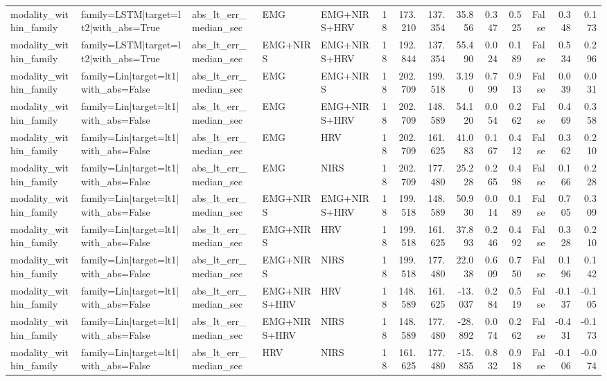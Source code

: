 \begin{table}
\begin{tabular}{lllllrrrrrrrrr}
modality_within_family & family=LSTM|target=lt2|with_abs=True & abs_lt_err_median_sec & EMG & EMG+NIRS+HRV & 18 & 173.210 & 137.354 & 35.856 & 0.347 & 0.525 & False & 0.348 & 0.173 \\
modality_within_family & family=LSTM|target=lt2|with_abs=True & abs_lt_err_median_sec & EMG+NIRS & EMG+NIRS+HRV & 18 & 192.844 & 137.354 & 55.490 & 0.024 & 0.189 & False & 0.534 & 0.296 \\
modality_within_family & family=Lin|target=lt1|with_abs=False & abs_lt_err_median_sec & EMG & EMG+NIRS & 18 & 202.709 & 199.518 & 3.190 & 0.799 & 0.913 & False & 0.039 & 0.031 \\
modality_within_family & family=Lin|target=lt1|with_abs=False & abs_lt_err_median_sec & EMG & EMG+NIRS+HRV & 18 & 202.709 & 148.589 & 54.120 & 0.054 & 0.262 & False & 0.469 & 0.358 \\
modality_within_family & family=Lin|target=lt1|with_abs=False & abs_lt_err_median_sec & EMG & HRV & 18 & 202.709 & 161.625 & 41.083 & 0.167 & 0.412 & False & 0.362 & 0.210 \\
modality_within_family & family=Lin|target=lt1|with_abs=False & abs_lt_err_median_sec & EMG & NIRS & 18 & 202.709 & 177.480 & 25.228 & 0.265 & 0.498 & False & 0.166 & 0.228 \\
modality_within_family & family=Lin|target=lt1|with_abs=False & abs_lt_err_median_sec & EMG+NIRS & EMG+NIRS+HRV & 18 & 199.518 & 148.589 & 50.930 & 0.014 & 0.189 & False & 0.705 & 0.309 \\
modality_within_family & family=Lin|target=lt1|with_abs=False & abs_lt_err_median_sec & EMG+NIRS & HRV & 18 & 199.518 & 161.625 & 37.893 & 0.246 & 0.492 & False & 0.328 & 0.210 \\
modality_within_family & family=Lin|target=lt1|with_abs=False & abs_lt_err_median_sec & EMG+NIRS & NIRS & 18 & 199.518 & 177.480 & 22.038 & 0.609 & 0.750 & False & 0.196 & 0.142 \\
modality_within_family & family=Lin|target=lt1|with_abs=False & abs_lt_err_median_sec & EMG+NIRS+HRV & HRV & 18 & 148.589 & 161.625 & -13.037 & 0.284 & 0.519 & False & -0.137 & -0.105 \\
modality_within_family & family=Lin|target=lt1|with_abs=False & abs_lt_err_median_sec & EMG+NIRS+HRV & NIRS & 18 & 148.589 & 177.480 & -28.892 & 0.074 & 0.262 & False & -0.431 & -0.173 \\
modality_within_family & family=Lin|target=lt1|with_abs=False & abs_lt_err_median_sec & HRV & NIRS & 18 & 161.625 & 177.480 & -15.855 & 0.832 & 0.918 & False & -0.106 & -0.074 \\

\end{tabular}
\end{table}
